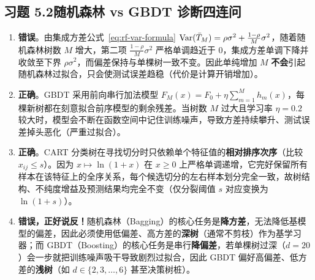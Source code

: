 \subsection*{习题 5.2\quad 随机森林 vs GBDT 诊断四连问}
\begin{enumerate}[label=(\arabic*), leftmargin=1.8em]
  \item \textbf{错误}。由集成方差公式~\eqref{eq:rf-var-formula} $\operatorname{Var}(\bar{T}_M) = \rho\sigma^2 + \frac{1-\rho}{M}\sigma^2$，随着随机森林树数 $M$ 增大，第二项 $\frac{1-\rho}{M}\sigma^2$ 严格单调趋近于 $0$，集成方差单调下降并收敛至下界 $\rho\sigma^2$，而偏差保持与单棵树一致不变。因此单纯增加 $M$ \textbf{不会}引起随机森林过拟合，只会使测试误差趋稳（代价是计算开销增加）。
  \item \textbf{正确}。GBDT 采用前向串行加法模型 $F_M(x) = F_0 + \eta\sum_{m=1}^M h_m(x)$，每棵新树都在刻意拟合前序模型的剩余残差。当树数 $M$ 过大且学习率 $\eta = 0.2$ 较大时，模型会不断在函数空间中记住训练噪声，导致方差持续攀升、测试误差掉头恶化（严重过拟合）。
  \item \textbf{正确}。CART 分类树在寻找切分时只依赖单个特征值的\textbf{相对排序次序}（比较 $x_{ij} \le s$）。因为 $x \mapsto \ln(1 + x)$ 在 $x \ge 0$ 上严格单调递增，它完好保留所有样本在该特征上的全序关系，每个候选切分的左右样本划分完全一致，故树结构、不纯度增益及预测结果均完全不变（仅分裂阈值 $s$ 对应变换为 $\ln(1 + s)$）。
  \item \textbf{错误，正好说反！}随机森林（Bagging）的核心任务是\textbf{降方差}，无法降低基模型的偏差，因此必须使用低偏差、高方差的\textbf{深树}（通常不剪枝）作为基学习器；而 GBDT（Boosting）的核心任务是串行\textbf{降偏差}，若单棵树过深（$d=20$）会一步就把训练噪声吸干导致剧烈过拟合，因此 GBDT 偏好高偏差、低方差的\textbf{浅树}（如 $d \in \{2, 3, \dots, 6\}$ 甚至决策树桩）。
\end{enumerate}

